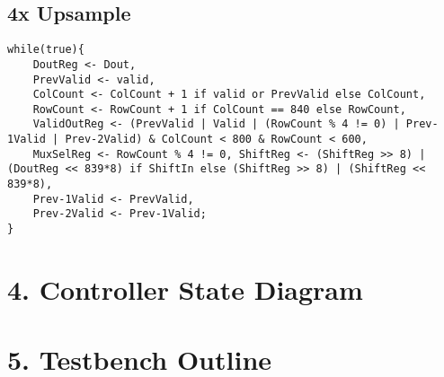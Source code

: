 \documentclass[11pt]{article}
\begin{document}
\subsection*{4x Upsample}
\begin{lstlisting}
while(true){
    DoutReg <- Dout, 
    PrevValid <- valid, 
    ColCount <- ColCount + 1 if valid or PrevValid else ColCount, 
    RowCount <- RowCount + 1 if ColCount == 840 else RowCount, 
    ValidOutReg <- (PrevValid | Valid | (RowCount % 4 != 0) | Prev-1Valid | Prev-2Valid) & ColCount < 800 & RowCount < 600, 
    MuxSelReg <- RowCount % 4 != 0, ShiftReg <- (ShiftReg >> 8) | (DoutReg << 839*8) if ShiftIn else (ShiftReg >> 8) | (ShiftReg << 839*8), 
    Prev-1Valid <- PrevValid, 
    Prev-2Valid <- Prev-1Valid;
}
\end{lstlisting}


\section*{4. Controller State Diagram}

\section*{5. Testbench Outline}
\end{document}
